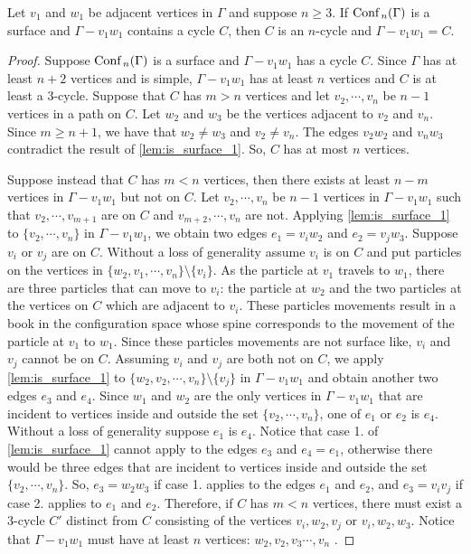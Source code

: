 \begin{lem}
Let \(v_1\) and \(w_1\) be adjacent vertices in \(\Gamma\) and suppose \(n \ge 3\).
If \(\text{Conf}\,_n(\Gamma)\) is a surface and \(\Gamma - v_1 w_1\) contains a cycle \(C\),
then \(C\) is an \(n\)-cycle and \(\Gamma - v_1 w_1 = C\). 
\end{lem}
\begin{proof}
Suppose \(\text{Conf}\,_n(\Gamma)\) is a surface and \(\Gamma - v_1 w_1\) has a cycle \(C\).
Since \(\Gamma\) has at least \(n + 2\) vertices and is simple, 
\(\Gamma - v_1 w_1\) has at least \(n\) vertices and \(C\) is at least a \(3\)-cycle.
Suppose that \(C\) has \(m > n\) vertices and let \(v_2, \cdots, v_n\) be \(n-1\) vertices in a path on \(C\).
Let \(w_2\) and \(w_3\) be the vertices adjacent to \(v_2\) and \(v_n\).
Since \(m \ge n + 1\), we have that \(w_2 \neq w_3\) and \(v_2 \neq v_n\).
The edges \(v_2 w_2\) and \(v_n w_3\) contradict the result of \ref{lem:is_surface_1}.
So, \(C\) has at most \(n\) vertices.

Suppose instead that \(C\) has \(m < n\) vertices, then there exists at least \(n - m\) vertices in \(\Gamma - v_1 w_1\) but not on \(C\).
Let \(v_2, \cdots, v_n\) be \(n-1\) vertices in \(\Gamma - v_1 w_1\) such that \(v_2, \cdots, v_{m + 1}\) are on \(C\) and
\(v_{m + 2}, \cdots, v_n\) are not. %
Applying \ref{lem:is_surface_1} to \(\{v_2, \cdots, v_n\}\) in \(\Gamma - v_1 w_1\), we obtain two edges \(e_1 = v_i w_2\) and \(e_2 = v_j w_3\).
Suppose \(v_i\) or \(v_j\) are on \(C\). Without a loss of generality assume \(v_i\) is on \(C\) and
put particles on the vertices in \(\{w_2, v_1, \cdots, v_n\}\setminus\{v_i\}\).
As the particle at \(v_1\) travels to \(w_1\), there are three particles that can move to \(v_i\): the particle at \(w_2\) and the two
particles at the vertices on \(C\) which are adjacent to \(v_i\).
These particles movements result in a book in the configuration space whose spine corresponds to the movement of the particle at \(v_1\) to \(w_1\).
Since these particles movements are not surface like, \(v_i\) and \(v_j\) cannot be on \(C\).
Assuming \(v_i\) and \(v_j\) are both not on \(C\), 
we apply \ref{lem:is_surface_1} to \(\{w_2, v_2, \cdots, v_n\}\setminus\{v_j\}\) in \(\Gamma - v_1 w_1\) and obtain another two edges \(e_3\) and \(e_4\).
Since \(w_1\) and \(w_2\) are the only vertices in \(\Gamma - v_1 w_1\) that are incident to vertices inside and outside the set \(\{v_2, \cdots, v_n\}\),
one of \(e_1\) or \(e_2\) is \(e_4\). Without a loss of generality suppose \(e_1\) is \(e_4\).
Notice that case 1. of \ref{lem:is_surface_1} cannot apply to the edges \(e_3\) and \(e_4 = e_1\), 
otherwise there would be three edges that are incident to vertices inside and outside the set \(\{v_2, \cdots, v_n\}\).
So, \(e_3 = w_2 w_3\) if case 1. applies to the edges \(e_1\) and \(e_2\), and \(e_3 = v_i v_j\) if case 2. applies to \(e_1\) and \(e_2\).
Therefore, if \(C\) has \(m < n\) vertices, there must exist a \(3\)-cycle \(C'\) distinct from \(C\) consisting of the vertices \(v_i, w_2, v_j\) or \(v_i, w_2, w_3\).
Notice that \(\Gamma - v_1 w_1\) must have at least \(n\) vertices: \(w_2, v_2, v_3 \cdots, v_n\) .


\end{proof}
